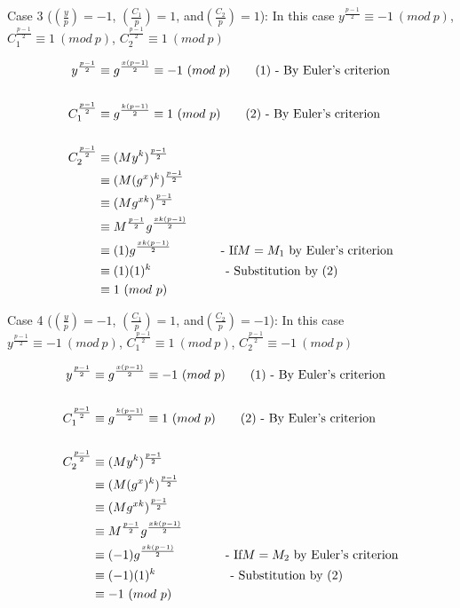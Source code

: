\documentclass[11pt]{article}
\theoremstyle{definition}
\providecommand{\Leg}[2]{\genfrac{(}{)}{}{}{#1}{#2}}
\begin{document}
\begin{enumerate}
Case 3 ($\Leg{y}{p} = -1$, $\Leg{C_1}{p} = 1$, and$\Leg{C_2}{p} = 1$):
In this case $y^{\frac{p-1}{2}} \equiv -1\ (mod\ p)$, $C_1^{\frac{p-1}{2}} \equiv 1\ (mod\ p)$, $C_2^{\frac{p-1}{2}} \equiv 1\ (mod\ p)$

\begin{align*}
y^{\frac{p-1}{2}} &\equiv g^{\frac{x(p-1)}{2}} \equiv -1\ (mod\ p)			\text{\qquad(1) - By Euler’s criterion} \\
&\\
C_1^{\frac{p-1}{2}} &\equiv g^{\frac{k(p-1)}{2}} \equiv 1\ (mod\ p)			\text{\qquad(2) - By Euler’s criterion} \\
& \\
C_2^{\frac{p-1}{2}} &\equiv (My^k)^{\frac{p-1}{2}} \\
&\equiv (M(g^x)^k)^{\frac{p-1}{2}} \\
&\equiv (Mg^{xk})^{\frac{p-1}{2}} \\
&\equiv M^{\frac{p-1}{2}}g^{\frac{xk(p-1)}{2}} \\
&\equiv (1)g^{\frac{xk(p-1)}{2}}								\text{\qquad\qquad- If$M = M_1$ by Euler’s criterion} \\
&\equiv (1)(1)^k											\text{\qquad\qquad\qquad- Substitution by (2)} \\
&\equiv 1\ (mod\ p)
\end{align*}

Case 4 ($\Leg{y}{p} = -1$, $\Leg{C_1}{p} = 1$, and$\Leg{C_2}{p} = -1$):
In this case $y^{\frac{p-1}{2}} \equiv -1\ (mod\ p)$, $C_1^{\frac{p-1}{2}} \equiv 1\ (mod\ p)$, $C_2^{\frac{p-1}{2}} \equiv -1\ (mod\ p)$

\begin{align*}
y^{\frac{p-1}{2}} &\equiv g^{\frac{x(p-1)}{2}} \equiv -1\ (mod\ p)			\text{\qquad(1) - By Euler’s criterion} \\
&\\
C_1^{\frac{p-1}{2}} &\equiv g^{\frac{k(p-1)}{2}} \equiv 1\ (mod\ p)			\text{\qquad(2) - By Euler’s criterion} \\
& \\
C_2^{\frac{p-1}{2}} &\equiv (My^k)^{\frac{p-1}{2}} \\
&\equiv (M(g^x)^k)^{\frac{p-1}{2}} \\
&\equiv (Mg^{xk})^{\frac{p-1}{2}} \\
&\equiv M^{\frac{p-1}{2}}g^{\frac{xk(p-1)}{2}} \\
&\equiv (-1)g^{\frac{xk(p-1)}{2}}								\text{\qquad\qquad- If$M = M_2$ by Euler’s criterion} \\
&\equiv (-1)(1)^k											\text{\qquad\qquad\qquad- Substitution by (2)} \\
&\equiv -1\ (mod\ p)
\end{align*}


\end{enumerate}
\end{document}
